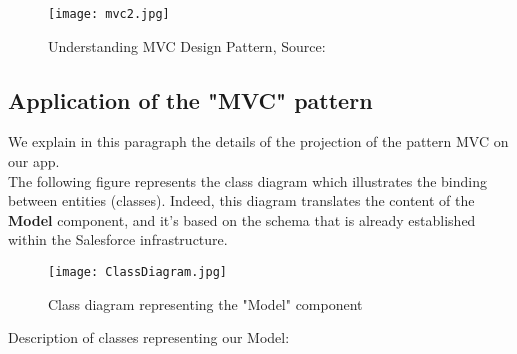 \begin{figure}[H]%
    \center   
    \texttt{[image: mvc2.jpg]}
    \caption{Understanding MVC Design Pattern, Source: \cite{7}}
\end{figure}
\subsection{Application of the "MVC" pattern}
We explain in this paragraph the details of the projection of the pattern
MVC on our app.\\
The following figure represents the class diagram which illustrates the binding
between entities (classes). Indeed, this diagram translates the content of the \textbf{Model} component, and it's based on the schema that is already established within the Salesforce infrastructure.
\begin{figure}[H]%
    \center   
    \texttt{[image: ClassDiagram.jpg]}
    \caption{Class diagram representing the "Model" component}
\end{figure}
\newpage
Description of classes representing our Model:
